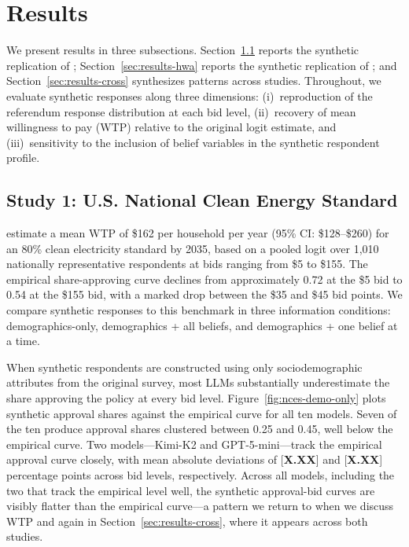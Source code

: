 \documentclass[12pt]{article}
\begin{document}
%

\section{Results}\label{sec:results}

We present results in three subsections. Section~\ref{sec:results-nces}
reports the synthetic replication of \textcite{Aldy2012};
Section~\ref{sec:results-hwa} reports the synthetic replication of
\textcite{Giguere2020}; and Section~\ref{sec:results-cross} synthesizes
patterns across studies. Throughout, we evaluate synthetic responses along
three dimensions: (i)~reproduction of the referendum response distribution
at each bid level, (ii)~recovery of mean willingness to pay (WTP) relative
to the original logit estimate, and (iii)~sensitivity to the inclusion of
belief variables in the synthetic respondent profile.

\subsection{Study 1: U.S. National Clean Energy Standard}\label{sec:results-nces}

\textcite{Aldy2012} estimate a mean WTP of \$162 per household per year
(95\% CI: \$128--\$260) for an 80\% clean electricity standard by 2035,
based on a pooled logit over 1{,}010 nationally representative respondents
at bids ranging from \$5 to \$155. The empirical share-approving curve
declines from approximately 0.72 at the \$5 bid to 0.54 at the \$155 bid,
with a marked drop between the \$35 and \$45 bid points. We compare
synthetic responses to this benchmark in three information conditions:
demographics-only, demographics + all beliefs, and demographics + one
belief at a time.

When synthetic respondents are constructed using only sociodemographic
attributes from the original survey, most LLMs substantially underestimate
the share approving the policy at every bid level.
Figure~\ref{fig:nces-demo-only} plots synthetic approval shares against
the empirical curve for all ten models. Seven of the ten produce approval
shares clustered between 0.25 and 0.45, well below the empirical curve.
Two models---Kimi-K2 and GPT-5-mini---track the empirical approval curve
closely, with mean absolute deviations of [\textbf{X.XX}] and
[\textbf{X.XX}] percentage points across bid levels, respectively. Across
all models, including the two that track the empirical level well, the
synthetic approval-bid curves are visibly flatter than the empirical
curve---a pattern we return to when we discuss WTP and again in
Section~\ref{sec:results-cross}, where it appears across both studies.
\end{document}

